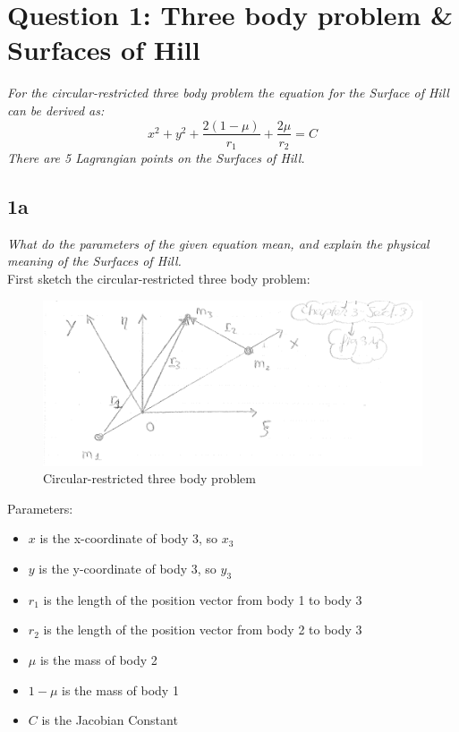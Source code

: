 \section{Question 1: Three body problem \& Surfaces of Hill}\label{sec:q1}    

\textit{For the circular-restricted three body problem the equation for the Surface of Hill can be derived as:}
\begin{equation}\label{eq:hill}
    x^{2}+y^{2}+\dfrac {2\left( 1-\mu \right) }{r_{1}}+\dfrac {2\mu }{r_{2}} = C
\end{equation}
\textit{There are 5 Lagrangian points on the Surfaces of Hill.}\\

\subsection{1a}
\textit{What do the parameters of the given equation mean, and explain the physical meaning of the Surfaces of Hill.} \\

First sketch the circular-restricted three body problem:
\begin{figure}[H]
    \centering
    \includegraphics[width=0.5\columnwidth]{Figures/1a.png}
    \caption{Circular-restricted three body problem}
    \label{fig:3body}
\end{figure}

Parameters:\\
\begin{itemize}
    \item $x$ is the x-coordinate of body 3, so $x_3$
    \item $y$ is the y-coordinate of body 3, so $y_3$
    \item $r_1$ is the length of the position vector from body 1 to body 3
    \item $r_2$ is the length of the position vector from body 2 to body 3
    \item $\mu$ is the mass of body 2
    \item $1-\mu$ is the mass of body 1
    \item $C$ is the Jacobian Constant
\end{itemize}


